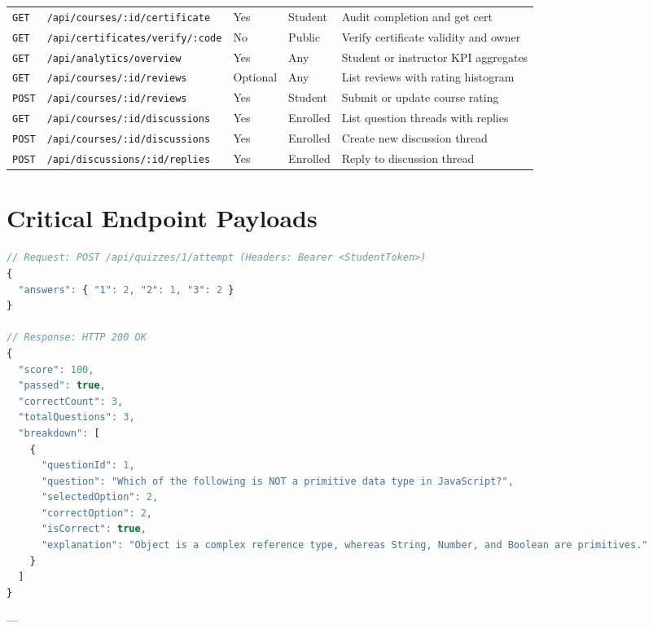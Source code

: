 \documentclass[12pt,a4paper]{report}
\begin{document}
\begin{table}[H]
\begin{tabularx}{\textwidth}{@{}llllX@{}}
\texttt{GET} & \texttt{/api/courses/:id/certificate} & Yes & Student & Audit completion and get cert \\
\texttt{GET} & \texttt{/api/certificates/verify/:code} & No & Public & Verify certificate validity and owner \\
\texttt{GET} & \texttt{/api/analytics/overview} & Yes & Any & Student or instructor KPI aggregates \\
\texttt{GET} & \texttt{/api/courses/:id/reviews} & Optional & Any & List reviews with rating histogram \\
\texttt{POST} & \texttt{/api/courses/:id/reviews} & Yes & Student & Submit or update course rating \\
\texttt{GET} & \texttt{/api/courses/:id/discussions} & Yes & Enrolled & List question threads with replies \\
\texttt{POST} & \texttt{/api/courses/:id/discussions} & Yes & Enrolled & Create new discussion thread \\
\texttt{POST} & \texttt{/api/discussions/:id/replies} & Yes & Enrolled & Reply to discussion thread \\ \bottomrule
\end{tabularx}
\end{table}

\section{Critical Endpoint Payloads}
\begin{lstlisting}[language=JavaScript,caption={Sample Quiz Submission Request and Graded Response Payload}]
// Request: POST /api/quizzes/1/attempt (Headers: Bearer <StudentToken>)
{
  "answers": { "1": 2, "2": 1, "3": 2 }
}

// Response: HTTP 200 OK
{
  "score": 100,
  "passed": true,
  "correctCount": 3,
  "totalQuestions": 3,
  "breakdown": [
    {
      "questionId": 1,
      "question": "Which of the following is NOT a primitive data type in JavaScript?",
      "selectedOption": 2,
      "correctOption": 2,
      "isCorrect": true,
      "explanation": "Object is a complex reference type, whereas String, Number, and Boolean are primitives."
    }
  ]
}
\end{lstlisting}

---

\end{document}
